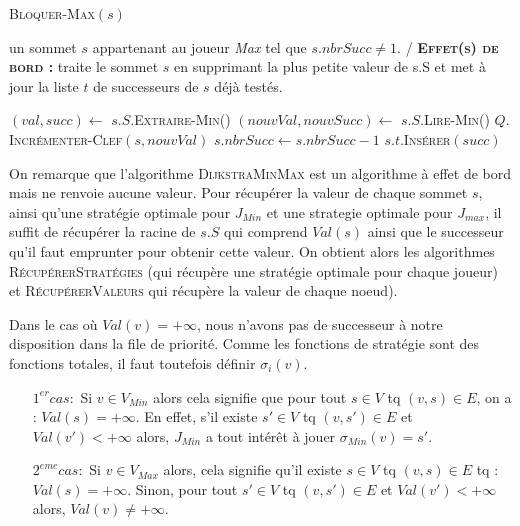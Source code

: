 \begin{algorithm}
	\caption{\textsc {Bloquer-Max}$(s)$}
	 \label{algo:bloquerMax}
	\begin{algorithmic}[1]
		\REQUIRE un sommet $s$ appartenant au joueur \textit{Max} tel que $s.nbrSucc \neq 1$.
		\ENSURE / \textbf{\textsc{Effet(s) de bord :}} traite le sommet $s$ en supprimant la plus petite valeur de s.S et met
		à jour la liste $t$ de successeurs de $s$ déjà testés.
		
			\STATE $(val,succ) \leftarrow$ $s.S.$\textsc{Extraire-Min}() \label{lalgo:bloc1}
			\STATE $(nouvVal,nouvSucc) \leftarrow$ $s.S.$\textsc{Lire-Min}()
			\STATE $Q.$\textsc{Incrémenter-Clef}$(s,nouvVal)$ \label{lalgo:bloc2}
			\STATE $s.nbrSucc \leftarrow s.nbrSucc - 1 $
			\STATE $s.t.$\textsc{Insérer}$(succ)$
			
				
			
\end{algorithmic}
		
\end{algorithm}

\FloatBarrier




On remarque que l'algorithme \textsc{DijkstraMinMax}  est un algorithme à effet de bord mais ne renvoie aucune valeur. Pour récupérer la valeur de chaque sommet $s$, ainsi qu'une stratégie optimale pour $J_{Min}$ et une strategie optimale pour $J_{max}$, il suffit de récupérer la racine de $s.S$ qui comprend $Val(s)$ ainsi que le successeur qu'il faut emprunter pour obtenir cette valeur. On obtient alors les algorithmes \textsc{RécupérerStratégies} (qui récupère une stratégie optimale pour chaque joueur) et \textsc{RécupérerValeurs} qui récupère la valeur de chaque noeud).

\begin{rem}
	
	Dans le cas où $Val(v) = +\infty$, nous n'avons pas de successeur à notre disposition dans la file de priorité. Comme les fonctions de stratégie sont des fonctions totales, il faut toutefois définir $\sigma _{i} (v)$.
\begin{enumerate}
	\item[$1^{er} cas:$] Si $v \in V_{Min}$ alors cela signifie que pour tout $s \in V$ tq $(v,s) \in E$, on a : $Val(s) = +\infty$. En effet, s'il existe $s' \in V$ tq $(v,s')\in E$ et $Val(v') < +\infty$ alors, $J_{Min}$ a tout intérêt à jouer $\sigma _{Min}(v) = s'$.
	\item[$2^{eme} cas:$] Si $v \in V_{Max}$ alors, cela signifie qu'il existe $s \in V$ tq $(v,s) \in E$ tq : $Val(s) = +\infty$. Sinon, pour tout $s' \in V$ tq $(v,s') \in E$ et $Val(v') < +\infty$ alors, $Val(v) \neq +\infty$. 
	
\end{enumerate}

\end{rem}

